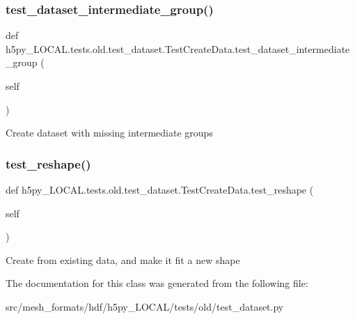 \subsubsection{\texorpdfstring{test\+\_\+dataset\+\_\+intermediate\+\_\+group()}{test\_dataset\_intermediate\_group()}}
{\footnotesize\ttfamily def h5py\+\_\+\+L\+O\+C\+A\+L.\+tests.\+old.\+test\+\_\+dataset.\+Test\+Create\+Data.\+test\+\_\+dataset\+\_\+intermediate\+\_\+group (\begin{DoxyParamCaption}\item[{}]{self }\end{DoxyParamCaption})}

\begin{DoxyVerb}Create dataset with missing intermediate groups \end{DoxyVerb}
 \mbox{\label{classh5py__LOCAL_1_1tests_1_1old_1_1test__dataset_1_1TestCreateData_a9e3e29014bfe53869669535afe2c88a6}} 
\subsubsection{\texorpdfstring{test\+\_\+reshape()}{test\_reshape()}}
{\footnotesize\ttfamily def h5py\+\_\+\+L\+O\+C\+A\+L.\+tests.\+old.\+test\+\_\+dataset.\+Test\+Create\+Data.\+test\+\_\+reshape (\begin{DoxyParamCaption}\item[{}]{self }\end{DoxyParamCaption})}

\begin{DoxyVerb}Create from existing data, and make it fit a new shape \end{DoxyVerb}
 

The documentation for this class was generated from the following file\+:\begin{DoxyCompactItemize}
\item 
src/mesh\+\_\+formats/hdf/h5py\+\_\+\+L\+O\+C\+A\+L/tests/old/test\+\_\+dataset.\+py\end{DoxyCompactItemize}
